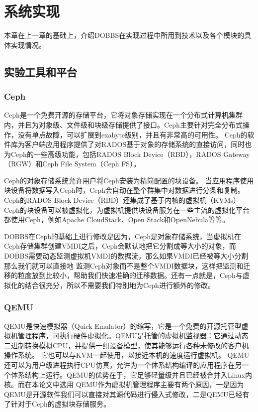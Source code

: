 
\chapter{系统实现}
\label{chap:systemimpl}
本章在上一章的基础上，介绍DOBBS在实现过程中所用到技术以及各个模块的具体实现情况。

\section{实验工具和平台}
\subsection{Ceph}
Ceph是一个免费开源的存储平台，它将对象存储实现在一个分布式计算机集群内，并且为对象级、文件级和块级存储提供了接口。Ceph主要针对完全分布式操作，没有单点故障，可以扩展到exabyte级别，并且有非常高的可用性。
Ceph的软件库为客户端应用程序提供了对RADOS基于对象的存储系统的直接访问，同时也为Ceph的一些高级功能，包括RADOS Block Device（RBD），RADOS Gateway（RGW）和Ceph File System（Ceph FS）。

Ceph的对象存储系统允许用户将Ceph安装为精简配置的块设备。 当应用程序使用块设备将数据写入Ceph时，Ceph会自动在整个群集中对数据进行分条和复制。 Ceph的RADOS Block Device（RBD）还集成了基于内核的虚拟机（KVMs）
Ceph的块设备可以被虚拟化，为虚拟机提供块设备服务在一些主流的虚拟化平台都使用Ceph，例如Apache CloudStack、Open Stack和OpenNebula等等。

DOBBS在Ceph的基础上进行修改是因为，Ceph是对象存储系统，当虚拟机在Ceph存储集群创建VMDI之后，Ceph会默认地把它分割成等大小的对象，而DOBBS需要动态监测虚拟机VMDI的数据流，那么如果VMDI已经被等大小分割那么我们就可以直接地
监测Ceph对象而不是整个VMDI数据块，这样把监测和迁移的粒度放到比较小，帮助我们快速准确的迁移数据。还有一点就是，Ceph与虚拟化的结合很充分，所以不需要我们特别地为Ceph进行额外的修改。

\subsection{QEMU}
QEMU\cite{bellard2005qemu}是快速模拟器（Quick Emulator）的缩写，它是一个免费的开源托管型虚拟机管理程序，可执行硬件虚拟化。QEMU是托管的虚拟机监视器：它通过动态二进制转换模拟CPU，并提供一组设备模型，使其能够运行各种未修改的客户机操作系统。 
它也可以与KVM一起使用，以接近本机的速度运行虚拟机。 QEMU还可以为用户级进程执行CPU仿真，允许为一个体系结构编译的应用程序在另一个体系结构上运行。QEMU的优势在于，它足够轻量级并且已经被合并入Linux内核。而在本论文中选用
QEMU作为虚拟机管理程序主要有两个原因，一是因为QEMU是开源软件我们可以直接对其源代码进行侵入式修改，二是QEMU已经有了针对于Ceph的虚拟块存储服务。

